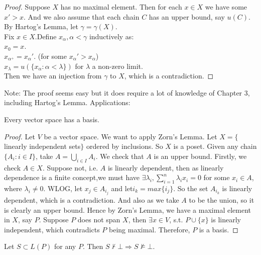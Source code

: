 \begin{proof} Suppose $X$ has no maximal element. Then for each
$x \in X$ we have some $x' > x$. And we also assume that each
chain $C$ has an upper bound, say $u(C)$.\\
By Hartog's Lemma, let $\gamma = \gamma(X)$.\\
Fix $x \in X$.Define $x_\alpha , \alpha < \gamma$ inductively as:\\
$x_0 = x$.\\
$x_{\alpha^+} = x_\alpha '$. (for some $x_\alpha ' > x_\alpha$)\\
$x_\lambda = u(\{x_\alpha: \alpha < \lambda\})$ for $\lambda$ a
non-zero limit.\\
Then we have an injection from $\gamma$ to $X$,
which is a contradiction.
\end{proof}
Note: The proof seems easy but it does require a lot of knowledge
of Chapter 3, including Hartog's Lemma.
Applications:\\
\begin{theorem} Every vector space has a basis.
\end{theorem}
\begin{proof} Let $V$ be a vector space. We want to apply Zorn's Lemma.
Let $X = \{$linearly independent sets$\}$ ordered by inclusions.
So $X$ is a poset. Given any chain $\{A_i: i \in I\}$,
take $A = \bigcup_{i \in I}A_i$. We check that $A$ is an upper bound.
Firstly, we check $A \in X$. Suppose not, i.e. $A$ is linearly dependent,
then as linearly dependence is a finite concept,we must have
$\exists \lambda_i, \sum_{i=1}^n \lambda_i x_i = 0$ for some $x_i \in A$,
where $\lambda_i \neq 0$. WLOG, let $x_j \in A_{i_j}$
and let$i_k = max \{i_j\}$. So the set $A_{i_k}$ is linearly dependent,
which is a contradiction. And also as we take $A$ to be the union,
so it is clearly an upper bound. Hence by Zorn's Lemma,
we have a maximal element in $X$, say $P$. Suppose $P$ does not span $X$,
then $\exists x \in V$, s.t. $P \cup \{x\}$ is linearly independent,
which contradicts $P$ being maximal. Therefore, $P$ is a basis.
\end{proof}
\begin{theorem} Let $S \subset L(P)$ for any $P$. Then $S \not \vdash \bot \Rightarrow S \not \models \bot$.
\end{theorem}

